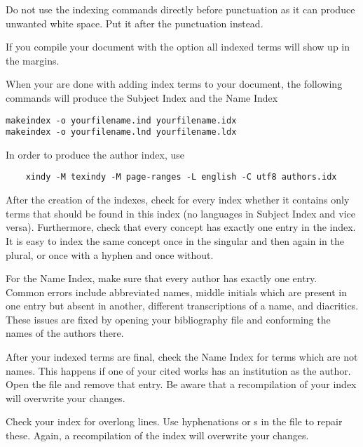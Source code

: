 Do not use the indexing commands directly before punctuation as it can produce unwanted white space. Put it after the punctuation instead.

If you compile your document with the option  all indexed terms will show up in the margins.

When your are done with adding index terms to your document, the following commands will produce the Subject Index and the Name Index
\begin{verbatim}
makeindex -o yourfilename.ind yourfilename.idx
makeindex -o yourfilename.lnd yourfilename.ldx
\end{verbatim}

In order to produce the author index, use
\begin{verbatim} 
    xindy -M texindy -M page-ranges -L english -C utf8 authors.idx
\end{verbatim}

After the creation of the indexes, check for every index whether it contains only terms that should be found in this index (no languages in Subject Index and vice versa). Furthermore, check that every concept has exactly one entry in the index. It is easy to index the same concept once in the singular and then again in the plural, or once with a hyphen and once without. 

For the Name Index, make sure that every author has exactly one entry. Common errors include abbreviated names, middle initials which are present in one entry but absent in another, different transcriptions of a name, and diacritics. These issues are fixed by opening your bibliography file and conforming the names of the authors there.

After your indexed terms are final, check the Name Index for terms which are not names. This happens if one of your cited works has an institution as the author. Open the  file and remove that entry. Be aware that a recompilation of your index will overwrite your changes.

Check your index for overlong lines. Use hyphenations  or s in the  file to repair these. Again, a recompilation of the index will overwrite your changes.

